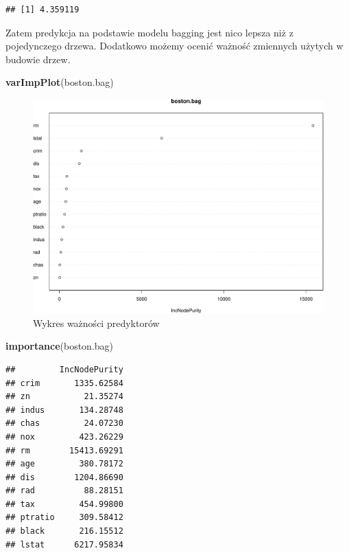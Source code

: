 \documentclass[
]{book}
\newenvironment{Shaded}{\begin{snugshade}}{\end{snugshade}}
\newcommand{\FunctionTok}[1]{\textcolor[rgb]{0.13,0.29,0.53}{\textbf{#1}}}
\newcommand{\NormalTok}[1]{#1}
\theoremstyle{plain}
\theoremstyle{definition}
\theoremstyle{definition}
\theoremstyle{definition}
\theoremstyle{definition}
\theoremstyle{definition}
\theoremstyle{remark}
\begin{document}
\begin{verbatim}
## [1] 4.359119
\end{verbatim}

Zatem predykcja na podstawie modelu bagging jest nico lepsza niż z pojedynczego drzewa. Dodatkowo możemy ocenić ważność zmiennych użytych w budowie drzew.

\begin{Shaded}
\begin{Highlighting}[]
\FunctionTok{varImpPlot}\NormalTok{(boston.bag)}
\end{Highlighting}
\end{Shaded}

\begin{figure}
\centering
\includegraphics{EksploracjaDanych_files/figure-latex/unnamed-chunk-38-1.pdf}
\caption{\label{fig:unnamed-chunk-38}Wykres ważności predyktorów}
\end{figure}

\begin{Shaded}
\begin{Highlighting}[]
\FunctionTok{importance}\NormalTok{(boston.bag)}
\end{Highlighting}
\end{Shaded}

\begin{verbatim}
##         IncNodePurity
## crim       1335.62584
## zn           21.35274
## indus       134.28748
## chas         24.07230
## nox         423.26229
## rm        15413.69291
## age         380.78172
## dis        1204.86690
## rad          88.28151
## tax         454.99800
## ptratio     309.58412
## black       216.15512
## lstat      6217.95834
\end{verbatim}
\end{document}
